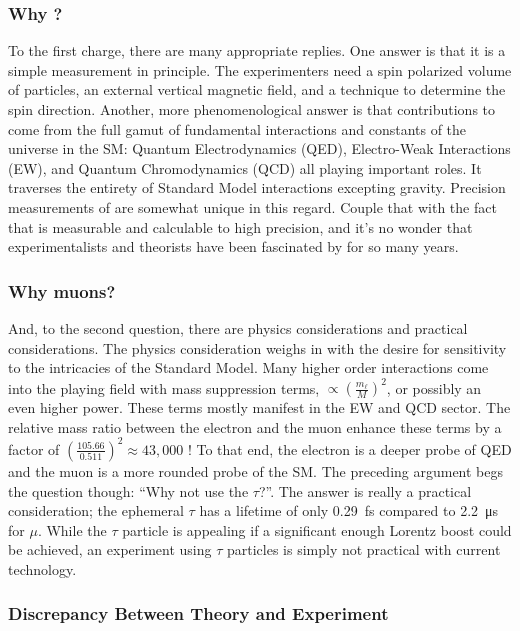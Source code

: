 \subsubsection{Why \gmtwo?}
To the first charge, there are many appropriate replies.  One answer is that it is a simple measurement in principle.  The experimenters need a spin polarized volume of particles, an external vertical magnetic field, and a technique to determine the spin direction. Another, more phenomenological answer is that contributions to \gmtwo come from the full gamut of fundamental interactions and constants of the universe in the SM: Quantum Electrodynamics (QED), Electro-Weak Interactions (EW), and Quantum Chromodynamics (QCD) all playing important roles. It traverses the entirety of Standard Model interactions excepting gravity. Precision measurements of \gmtwo are somewhat unique in this regard.  Couple that with the fact that \gmtwo is measurable and calculable to high precision, and it's no wonder that experimentalists and theorists have been fascinated by \gmtwo for so many years.

\subsubsection{Why muons?}
And, to the second question, there are physics considerations and practical considerations.  The physics consideration weighs in with the desire for sensitivity to the intricacies of the Standard Model.  Many higher order interactions come into the playing field with mass suppression terms, $\propto (\frac{m_\ell}{M})^2$, or possibly an even higher power.  These terms mostly manifest in the EW and QCD sector.  The relative mass ratio between the electron and the muon enhance these terms by a factor of $(\frac{105.66}{0.511})^2 \approx 43,000$ \cite{the-muon-g-2}!  To that end, the electron \gmtwo is a deeper probe of QED and the muon \gmtwo is a more rounded probe of the SM.  The preceding argument begs the question though: ``Why not use the $\tau$?''.  The answer is really a practical consideration; the ephemeral $\tau$ has a lifetime of only \SI{0.29}{\femto\second} compared to \SI{2.2}{\micro\second} for $\mu$\cite{codata}.  While the $\tau$ particle is appealing if a significant enough Lorentz boost could be achieved, an experiment using $\tau$ particles is simply not practical with current technology.

\subsubsection{Discrepancy Between Theory and Experiment}

